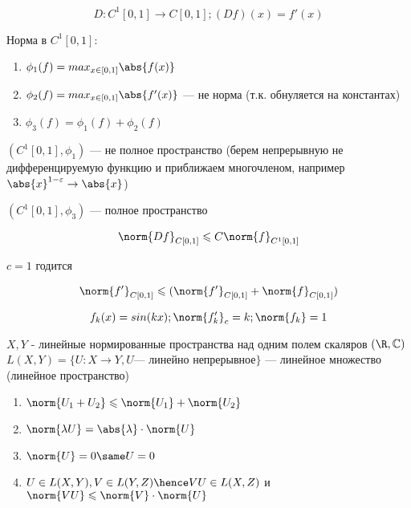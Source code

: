 \begin{example}
    \[
        D: C^1[0, 1] \to C[0, 1]; (Df)(x) = f'(x)
    \]

    Норма в $C^1[0, 1]$:

    \begin{enumerate}
        \item $
            \phi_1(f) = max_{x \in [0, 1]} \abs{f(x)}  
        $ 
        \item $
            \phi_2(f) = max_{x \in [0, 1]} \abs{f'(x)}  
        $ --- не норма (т.к. обнуляется на константах)
        \item $
            \phi_3(f) = \phi_1(f) + \phi_2(f)
        $
    \end{enumerate}

    $(C^1[0, 1], \phi_1)$ --- не полное пространство (берем непрерывную не дифференцируемую функцию и приближаем многочленом, например $\abs{x} ^ {1 - \varepsilon} \to \abs{x} $)

    \exercise  $(C^1[0, 1], \phi_3)$ --- полное пространство


    \[
        \norm{Df}_{C[0, 1]} \leqslant C \norm{f}_{C^1 [0,1]}
    \]

    $c = 1$ годится

    \[
        \norm{f'}_{C[0, 1]} \leqslant (\norm{f'}_{C[0,1]} + \norm{f}_{C[0, 1]})
    \]

    \[
        f_k(x) = sin(kx);
        \norm{f'_k}_c = k;
        \norm{f_k} = 1
    \]
\end{example}


\begin{theorem}
    $X, Y$ - линейные нормированные пространства над одним полем скаляров $(\R, \mathbb{C})$ \\ $L(X, Y) = \{ U : X \to Y, U \text{--- линейно непрерывное} \}$ --- линейное множество (линейное пространство)

    \begin{enumerate}
        \item $\norm{U_1 + U_2} \leqslant \norm{U_1} + \norm{U_2}$
        \item $\norm{\lambda U} = \abs{\lambda} \cdot \norm{U}$
        \item $\norm{U} = 0 \same U = 0$
        \item $U \in L(X, Y), V \in L(Y, Z) \hence VU \in L(X, Z)$ и $\norm{VU} \leqslant \norm{V} \cdot \norm{U}$
    \end{enumerate}
\end{theorem}



